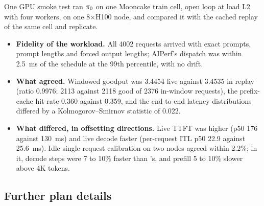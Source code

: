 One GPU smoke test ran $\pi_{0}$ on one Mooncake train cell, open loop at load L2 with four workers,
on one 8$\times$H100 node, and compared it with the cached replay of the same cell and replicate.
\begin{itemize}
  \item \textbf{Fidelity of the workload.} All \num{4002} requests arrived with exact prompts, prompt
    lengths and forced output lengths; AIPerf's dispatch was within \SI{2.5}{ms} of the schedule at
    the 99th percentile, with no drift.
  \item \textbf{What agreed.} Windowed goodput was 3.4454 live against 3.4535 in replay (ratio
    0.9976; 2113 against 2118 good of 2376 in-window requests), the prefix-cache hit rate 0.360
    against 0.359, and the end-to-end latency distributions differed by a Kolmogorov--Smirnov
    statistic of 0.022.
  \item \textbf{What differed, in offsetting directions.} Live TTFT was higher (p50 176 against
    \SI{130}{ms}) and live decode faster (per-request ITL p50 22.9 against \SI{25.6}{ms}). Idle
    single-request calibration on two nodes agreed within 2.2\%; in it, decode steps were 7 to 10\%
    faster than \ais{}'s, and prefill 5 to 10\% slower above 4K tokens.
\end{itemize}

\subsection{Further plan details}

